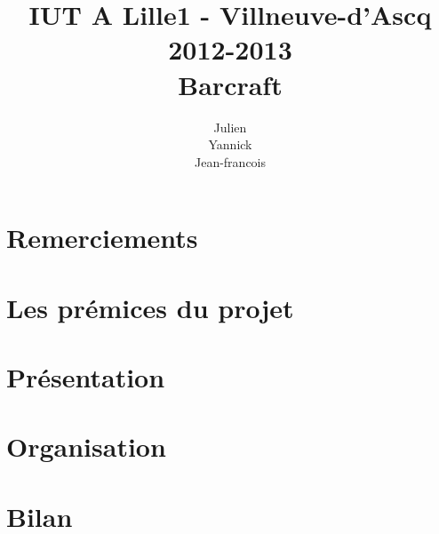 \documentclass[12pt,a4paper]{report}
\title
{
	\normalsize{IUT A Lille1 - Villneuve-d'Ascq\\
	2012-2013}\\
	\vspace{15mm}
  \Huge{Barcraft
    \vspace{15mm}}
}
\author{
\bsc{Stechele} Julien\\
\bsc{Vanuxem} Yannick\\
\bsc{Serir} Jean-francois\\
	\vspace{30mm}
}
\begin{document}

\maketitle

\section{Remerciements}%
\label{sec:remerciements}




\renewcommand{\contentsname}{Sommaire}


\section{Les prémices du projet}%
\label{sec:les_premices_du_projet}

  


\section{Présentation}%
\label{sec:presentation}

  


\section{Organisation}%
\label{sec:organisation}

  


\section{Bilan}%
\label{sec:bilan}

  


\appendix

\end{document}
